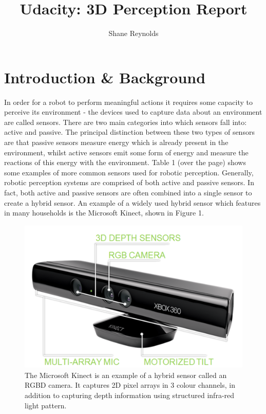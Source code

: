 \documentclass[a4paper]{article}
\begin{document}
\title{Udacity: 3D Perception Report}
\author{Shane Reynolds}
\maketitle
\tableofcontents
\newpage
\section{Introduction \& Background}
In order for a robot to perform meaningful actions it requires some capacity to perceive its environment - the devices used to capture data about an environment are called sensors. There are two main categories into which sensors fall into: active and passive. The principal distinction between these two types of sensors are that passive sensors measure energy which is already present in the environment, whilst active sensors emit some form of energy and measure the reactions of this energy with the environment. Table 1 (over the page) shows some examples of more common sensors used for robotic perception. Generally, robotic perception systems are comprised of both active and passive sensors. In fact, both active and passive sensors are often combined into a single sensor to create a hybrid sensor. An example of a widely used hybrid sensor which features in many households is the Microsoft Kinect, shown in Figure 1.

\begin{figure}[h]
\centering
\includegraphics[scale=0.4]{image1}
\caption{The Microsoft Kinect is an example of a hybrid sensor called an RGBD camera. It captures 2D pixel arrays in 3 colour channels, in addition to capturing depth information using structured infra-red light pattern.}
\end{figure}
\end{document}
